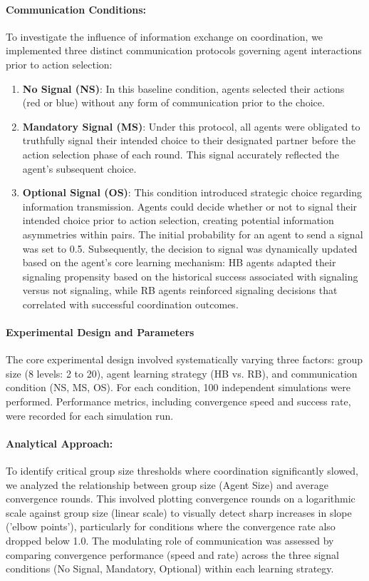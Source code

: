 \documentclass[12pt,a4paper]{article}
\begin{document}
\paragraph{Communication Conditions:} 
To investigate the influence of information exchange on coordination, we implemented three distinct communication protocols governing agent interactions prior to action selection:

\begin{enumerate}
    \item \textbf{No Signal (NS)}: In this baseline condition, agents selected their actions (red or blue) without any form of communication prior to the choice.
    
    \item \textbf{Mandatory Signal (MS)}: Under this protocol, all agents were obligated to truthfully signal their intended choice to their designated partner before the action selection phase of each round. This signal accurately reflected the agent's subsequent choice.
    
    \item \textbf{Optional Signal (OS)}: This condition introduced strategic choice regarding information transmission. Agents could decide whether or not to signal their intended choice prior to action selection, creating potential information asymmetries within pairs. The initial probability for an agent to send a signal was set to 0.5. Subsequently, the decision to signal was dynamically updated based on the agent's core learning mechanism: HB agents adapted their signaling propensity based on the historical success associated with signaling versus not signaling, while RB agents reinforced signaling decisions that correlated with successful coordination outcomes.
\end{enumerate}

\paragraph{Experimental Design and Parameters}
The core experimental design involved systematically varying three factors: group size (8 levels: 2 to 20), agent learning strategy (HB vs. RB), and communication condition (NS, MS, OS). For each condition, 100 independent simulations were performed. Performance metrics, including convergence speed and success rate, were recorded for each simulation run.

\paragraph{Analytical Approach:} To identify critical group size thresholds where coordination significantly slowed, we analyzed the relationship between group size (Agent Size) and average convergence rounds. This involved plotting convergence rounds on a logarithmic scale against group size (linear scale) to visually detect sharp increases in slope ('elbow points'), particularly for conditions where the convergence rate also dropped below 1.0. The modulating role of communication was assessed by comparing convergence performance (speed and rate) across the three signal conditions (No Signal, Mandatory, Optional) within each learning strategy.
\end{document}
